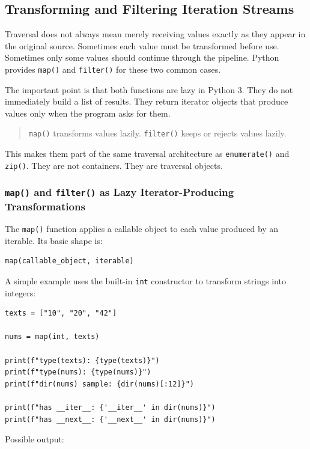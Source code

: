 \subsection{Transforming and Filtering Iteration Streams}

Traversal does not always mean merely receiving values exactly as they appear in the original source. Sometimes each value must be transformed before use. Sometimes only some values should continue through the pipeline. Python provides \texttt{map()} and \texttt{filter()} for these two common cases.

The important point is that both functions are lazy in Python 3. They do not immediately build a list of results. They return iterator objects that produce values only when the program asks for them.

\begin{quote}
\texttt{map()} transforms values lazily. \texttt{filter()} keeps or rejects values lazily.
\end{quote}

This makes them part of the same traversal architecture as \texttt{enumerate()} and \texttt{zip()}. They are not containers. They are traversal objects.

\subsubsection{\texttt{map()} and \texttt{filter()} as Lazy Iterator-Producing Transformations}

The \texttt{map()} function applies a callable object to each value produced by an iterable. Its basic shape is:

\begin{verbatim}
map(callable_object, iterable)
\end{verbatim}

A simple example uses the built-in \texttt{int} constructor to transform strings into integers:

\begin{verbatim}
texts = ["10", "20", "42"]

nums = map(int, texts)

print(f"type(texts): {type(texts)}")
print(f"type(nums): {type(nums)}")
print(f"dir(nums) sample: {dir(nums)[:12]}")

print(f"has __iter__: {'__iter__' in dir(nums)}")
print(f"has __next__: {'__next__' in dir(nums)}")
\end{verbatim}

Possible output:

